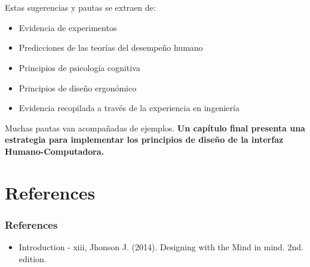 \documentclass[11pt]{beamer}
\begin{document}
\section{}
\begin{frame}
Estas sugerencias y pautas se extraen de: 
\begin{itemize}
\item Evidencia de experimentos
\item Predicciones de las teorías del desempeño humano
\item Principios de psicología cognitiva
\item Principios de diseño ergonómico
\item Evidencia recopilada a través de la experiencia en ingeniería
\end{itemize}

\justifying \vspace{5mm} Muchas pautas van acompañadas de ejemplos. {\bf Un capítulo final presenta una estrategia para implementar los principios de diseño de la interfaz Humano-Computadora.}

\end{frame}


\section{References}
\begin{frame}
\frametitle{References}
\begin{itemize}
\item Introduction - xiii, Jhonson J. (2014). Designing with the Mind in mind. 2nd. edition.
\end{itemize}
\end{frame}
\end{document}
